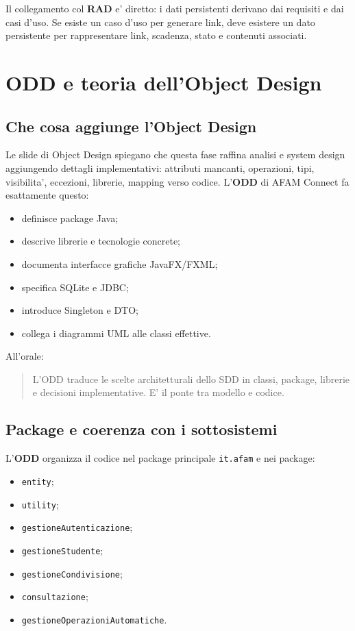 ﻿\documentclass[11pt,a4paper]{article}
\newcommand{\doc}[1]{\textbf{#1}}
\begin{document}
Il collegamento col \doc{RAD} e' diretto: i dati persistenti derivano dai requisiti e dai casi
d'uso. Se esiste un caso d'uso per generare link, deve esistere un dato persistente per
rappresentare link, scadenza, stato e contenuti associati.

\section{ODD e teoria dell'Object Design}

\subsection{Che cosa aggiunge l'Object Design}

Le slide di Object Design spiegano che questa fase raffina analisi e system design
aggiungendo dettagli implementativi: attributi mancanti, operazioni, tipi, visibilita',
eccezioni, librerie, mapping verso codice. L'\doc{ODD} di AFAM Connect fa esattamente
questo:
\begin{itemize}
  \item definisce package Java;
  \item descrive librerie e tecnologie concrete;
  \item documenta interfacce grafiche JavaFX/FXML;
  \item specifica SQLite e JDBC;
  \item introduce Singleton e DTO;
  \item collega i diagrammi UML alle classi effettive.
\end{itemize}

All'orale:
\begin{quote}
L'ODD traduce le scelte architetturali dello SDD in classi, package, librerie e
decisioni implementative. E' il ponte tra modello e codice.
\end{quote}

\subsection{Package e coerenza con i sottosistemi}

L'\doc{ODD} organizza il codice nel package principale \texttt{it.afam} e nei package:
\begin{itemize}
  \item \texttt{entity};
  \item \texttt{utility};
  \item \texttt{gestioneAutenticazione};
  \item \texttt{gestioneStudente};
  \item \texttt{gestioneCondivisione};
  \item \texttt{consultazione};
  \item \texttt{gestioneOperazioniAutomatiche}.
\end{itemize}
\end{document}

